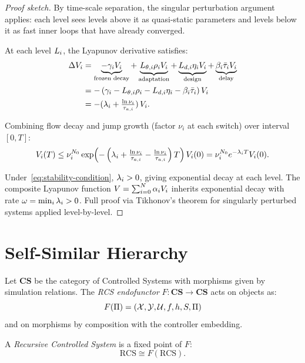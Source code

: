 \documentclass[11pt,a4paper]{article}
\begin{document}
\begin{proof}[Proof sketch]
By time-scale separation, the singular perturbation argument applies: each
level sees levels above it as quasi-static parameters and levels below it as
fast inner loops that have already converged.

At each level $L_{i}$, the Lyapunov derivative satisfies:
\begin{align}
  \Delta \lyap{i}
  &= \underbrace{-\decay_i \lyap{i}}_{\text{frozen decay}}
  + \underbrace{L_{\param,i} \rho_i \lyap{i}}_{\text{adaptation}}
  + \underbrace{L_{d,i} \eta_i \lyap{i}}_{\text{design}}
  + \underbrace{\beta_i \taubar_i \lyap{i}}_{\text{delay}} \\
  &= -\left(\decay_i - L_{\param,i}\rho_i - L_{d,i}\eta_i
  - \beta_i \taubar_i\right) \lyap{i} \\
  &= -(\stab_i + \tfrac{\ln\nu_i}{\taua[i]}) \, \lyap{i}.
\end{align}

Combining flow decay and jump growth (factor $\nu_i$ at each switch)
over interval $[0, T]$:
\begin{equation}
  \lyap{i}(T) \leq \nu_i^{N_0}
  \exp\!\left(-\left(\stab_i + \tfrac{\ln\nu_i}{\taua[i]}
  - \tfrac{\ln\nu_i}{\taua[i]}\right) T\right) \lyap{i}(0)
  = \nu_i^{N_0} e^{-\stab_i T} \lyap{i}(0).
\end{equation}

Under~\eqref{eq:stability-condition}, $\lambda_i > 0$, giving exponential
decay at each level.  The composite Lyapunov function
$V = \sum_{i=0}^{N} \alpha_i V_{i}$ inherits exponential decay with rate
$\omega = \min_i \lambda_i > 0$.  Full proof via Tikhonov's theorem for
singularly perturbed systems applied level-by-level.
\end{proof}


\section{Self-Similar Hierarchy}
\label{sec:self-similar}

\begin{definition}
\label{def:endofunctor}
Let $\mathbf{CS}$ be the category of Controlled Systems with morphisms given
by simulation relations.  The \emph{RCS endofunctor}
$F : \mathbf{CS} \to \mathbf{CS}$ acts on objects as:
\begin{equation}
  F(\Pi) = (\mathcal{X}, \mathcal{Y}, \mathcal{U}, f, h, S, \Pi)
\end{equation}
and on morphisms by composition with the controller embedding.

A \emph{Recursive Controlled System} is a fixed point of $F$:
\begin{equation}
  \text{RCS} \cong F(\text{RCS}).
\end{equation}
\end{definition}
\end{document}
